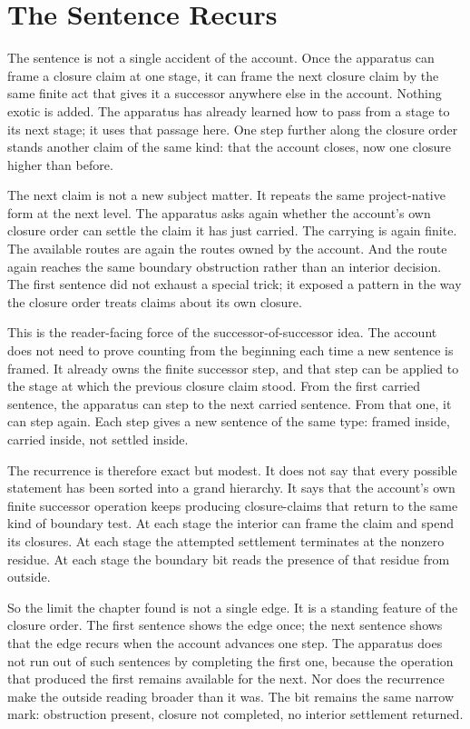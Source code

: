 \section{The Sentence Recurs}

The sentence is not a single accident of the account. Once the apparatus can frame a closure
claim at one stage, it can frame the next closure claim by the same finite act that gives it a
successor anywhere else in the account. Nothing exotic is added. The apparatus has already
learned how to pass from a stage to its next stage; it uses that passage here. One step further
along the closure order stands another claim of the same kind: that the account closes, now one
closure higher than before.

The next claim is not a new subject matter. It repeats the same project-native form at the next
level. The apparatus asks again whether the account's own closure order can settle the claim it
has just carried. The carrying is again finite. The available routes are again the routes owned
by the account. And the route again reaches the same boundary obstruction rather than an
interior decision. The first sentence did not exhaust a special trick; it exposed a pattern in
the way the closure order treats claims about its own closure.

This is the reader-facing force of the successor-of-successor idea. The account does not need
to prove counting from the beginning each time a new sentence is framed. It already owns the
finite successor step, and that step can be applied to the stage at which the previous closure
claim stood. From the first carried sentence, the apparatus can step to the next carried
sentence. From that one, it can step again. Each step gives a new sentence of the same type:
framed inside, carried inside, not settled inside.

The recurrence is therefore exact but modest. It does not say that every possible statement has
been sorted into a grand hierarchy. It says that the account's own finite successor operation
keeps producing closure-claims that return to the same kind of boundary test. At each stage the
interior can frame the claim and spend its closures. At each stage the attempted settlement
terminates at the nonzero residue. At each stage the boundary bit reads the presence of that
residue from outside.

So the limit the chapter found is not a single edge. It is a standing feature of the closure
order. The first sentence shows the edge once; the next sentence shows that the edge recurs
when the account advances one step. The apparatus does not run out of such sentences by
completing the first one, because the operation that produced the first remains available for
the next. Nor does the recurrence make the outside reading broader than it was. The bit remains
the same narrow mark: obstruction present, closure not completed, no interior settlement
returned.

